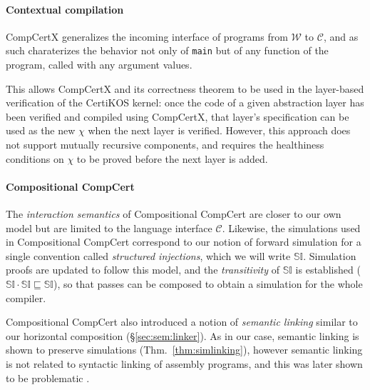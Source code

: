 \documentclass[acmsmall,authordraft]{acmart}
\newcommand{\scref}{\sqsubseteq}
\begin{document}

\paragraph{Contextual compilation} %

CompCertX \cite{popl15} generalizes
the incoming interface of programs
from $\mathcal{W}$ to $\mathcal{C}$,
and as such charaterizes the behavior
not only of \texttt{main}
but of any function of the program,
called with any argument values.

This allows CompCertX and its correctness theorem
to be used in the layer-based verification of
the CertiKOS kernel:
once the code of a given abstraction layer has been verified
and compiled using CompCertX,
that layer's specification can be used as the new $\chi$
when the next layer is verified.
However,
this approach does not support
mutually recursive components,
and requires the healthiness conditions on $\chi$
to be proved before the next layer is added.


\paragraph{Compositional CompCert} %

The \emph{interaction semantics} of
Compositional CompCert \cite{compcompcert}
are closer to our own model
but are limited to the language interface $\mathcal{C}$.
Likewise, the simulations used in Compositional CompCert
correspond to our notion of forward simulation
for a single convention called \emph{structured injections},
which we will write $\mathbb{SI}$.
Simulation proofs are updated to follow this model,
and the \emph{transitivity} of $\mathbb{SI}$ is established
($\mathbb{SI} \cdot \mathbb{SI} \scref \mathbb{SI}$),
so that passes can be composed
to obtain a simulation for the whole compiler.

Compositional CompCert also introduced a notion of \emph{semantic linking}
similar to our horizontal composition
(\S\ref{sec:sem:linker}).
As in our case,
semantic linking is shown to preserve simulations
(Thm.~\ref{thm:simlinking}),
however semantic linking is not related to
syntactic linking of assembly programs,
and this was later shown to be problematic \cite{compcertm}.
\end{document}
